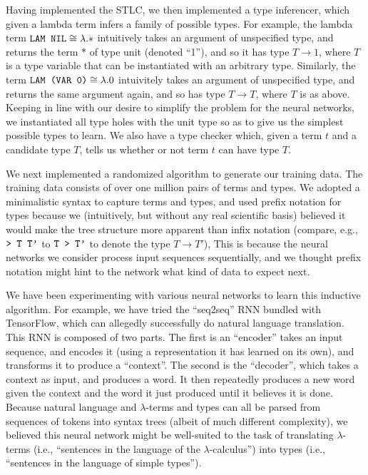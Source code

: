 \documentclass{amsart}
\begin{document}
Having implemented the STLC, we then implemented a type inferencer,
which given a lambda term infers a family of possible types. For
example, the lambda term $\verb!LAM NIL! \cong \lambda.*$ intuitively
takes an argument of unspecified type, and returns the term $*$ of
type unit (denoted ``1''), and so it has type $T \to 1$, where $T$ is
a type variable that can be instantiated with an arbitrary
type. Similarly, the term $\verb!LAM (VAR 0)! \cong \lambda.0$
intuivitely takes an argument of unspecified type, and returns the
same argument again, and so has type $T \to T$, where $T$ is as above.
Keeping in line with our desire to simplify the problem for the neural
networks, we instantiated all type holes with the unit type so as to
give us the simplest possible types to learn. We also have a type
checker which, given a term $t$ and a candidate type $T$, tells us
whether or not term $t$ can have type $T$.

We next implemented a randomized algorithm to generate our training
data. The training data consists of over one million pairs of terms
and types. We adopted a minimalistic syntax to capture terms and
types, and used prefix notation for types because we (intuitively, but
without any real scientific basis) believed it would make the tree
structure more apparent than infix notation (compare, e.g.,
$\verb!> T T'!$ to $\verb!T > T'!$ to denote the type $T \to T'$),
This is because the neural networks we consider process input
sequences sequentially, and we thought prefix notation might hint to
the network what kind of data to expect next.

We have been experimenting with various neural networks to learn this
inductive algorithm. For example, we have tried the ``seq2seq'' RNN
bundled with TensorFlow, which can allegedly successfully do
natural language translation. This RNN is composed of two parts. The
first is an ``encoder'' takes an input sequence, and encodes it (using
a representation it has learned on its own), and transforms it to
produce a ``context''. The second is the ``decoder'', which takes a
context as input, and produces a word. It then repeatedly produces a
new word given the context and the word it just produced until it
believes it is done. Because natural language and $\lambda$-terms and
types can all be parsed from sequences of tokens into syntax trees
(albeit of much different complexity), we believed this neural network
might be well-suited to the task of translating $\lambda$-terms (i.e.,
``sentences in the language of the $\lambda$-calculus'') into types
(i.e., ``sentences in the language of simple types'').
\end{document}

